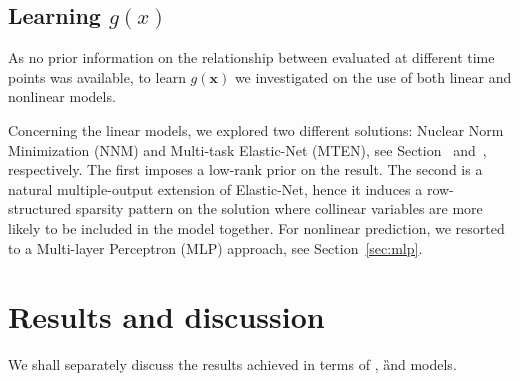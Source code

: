 
\subsection{Learning $g(x)$}

As no prior information on the relationship between \PCOs evaluated at different time points was available, to learn $g(\bm{x})$ we investigated on the use of both linear and nonlinear models.

Concerning the linear models, we explored two different solutions: Nuclear Norm Minimization (\ac{NNM}) and Multi-task Elastic-Net (\ac{MTEN}), see Section~\cite{sec:nucelear_norm_minimization} and~\cite{sec:elastic_net}, respectively. The first imposes a low-rank prior on the result. The second is a natural multiple-output extension of Elastic-Net, hence it induces a row-structured sparsity pattern on the solution where collinear variables are more likely to be included in the model together. For nonlinear prediction, we resorted to a Multi-layer Perceptron (\ac{MLP}) approach, see Section~\ref{sec:mlp}.

\section{Results and discussion}\label{sec:aism_results}

We shall separately discuss the results achieved in terms of \F, \G and \FOG models.

